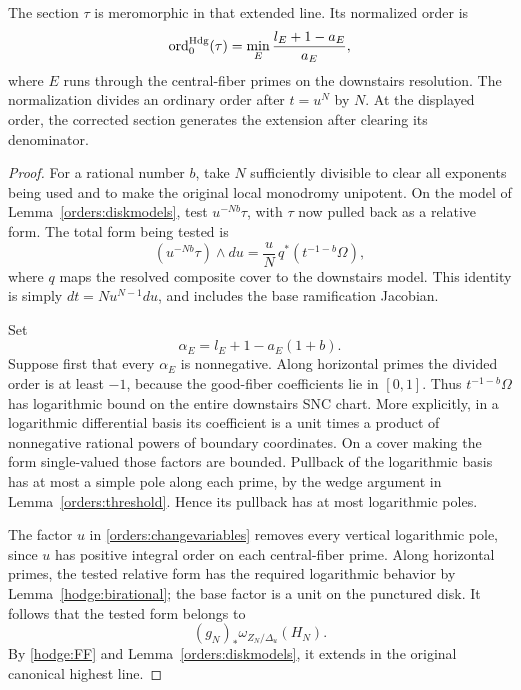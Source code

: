 \begin{lemma}
\label{orders:order}
The section \(\tau\) is meromorphic in that extended line.  Its
normalized order is
\begin{equation}
 \operatorname{ord}^{\mathrm{Hdg}}_0(\tau)
       =\min_E\frac{l_E+1-a_E}{a_E},
 \label{orders:generalorder}
\end{equation}
where \(E\) runs through the central-fiber primes on the downstairs
resolution.  The normalization divides an ordinary order after
\(t=u^N\) by \(N\).  At the displayed order, the corrected section
generates the extension after clearing its denominator.
\end{lemma}

\begin{proof}
For a rational number \(b\), take \(N\) sufficiently divisible to
clear all exponents being used and to make the original local
monodromy unipotent.  On the model of
Lemma~\ref{orders:diskmodels}, test \(u^{-Nb}\tau\), with \(\tau\)
now pulled back as a relative form.  The total form being tested is
\begin{equation}
 (u^{-Nb}\tau)\wedge du
       =\frac{u}{N}\,q^*(t^{-1-b}\Omega),
 \label{orders:changevariables}
\end{equation}
where \(q\) maps the resolved composite cover to the downstairs
model.  This identity is simply \(dt=Nu^{N-1}du\), and includes
the base ramification Jacobian.

Set
\[
                  \alpha_E=l_E+1-a_E(1+b).
\]
Suppose first that every \(\alpha_E\) is nonnegative.
Along horizontal primes the divided order is at least \(-1\),
because the good-fiber coefficients lie in \([0,1]\).
Thus \(t^{-1-b}\Omega\) has logarithmic bound on the entire
downstairs SNC chart.  More explicitly, in a logarithmic
differential basis its coefficient is a unit times a product of
nonnegative rational powers of boundary coordinates.  On a cover
making the form single-valued those factors are bounded.  Pullback
of the logarithmic basis has at most a simple pole along each
prime, by the wedge argument in
Lemma~\ref{orders:threshold}.  Hence its pullback has at most
logarithmic poles.

The factor \(u\) in \eqref{orders:changevariables} removes every
vertical logarithmic pole, since \(u\) has positive integral order
on each central-fiber prime.  Along horizontal primes, the tested
relative form has the required logarithmic behavior by
Lemma~\ref{hodge:birational}; the base factor is a unit on the
punctured disk.  It follows that the tested form belongs to
\[
             (g_N)_*\omega_{Z_N/\Delta_u}(H_N).
\]
By \eqref{hodge:FF} and Lemma~\ref{orders:diskmodels}, it extends
in the original canonical highest line.


\end{proof}
